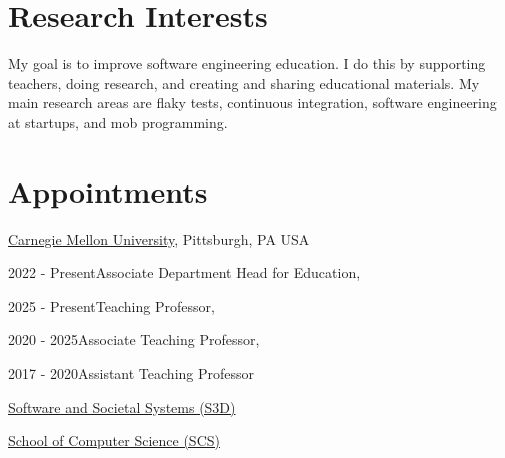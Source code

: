 \documentclass[10pt]{article}
\begin{document}

% 
\thispagestyle{empty}
\section{Research Interests}
My goal is to improve software engineering education.  I do this by supporting teachers, doing research, and creating and sharing educational materials. My main research areas are flaky tests, continuous integration, software engineering at startups, and mob programming.
 
%



\section{Appointments}

 \href{https://www.cmu.edu/}{Carnegie Mellon University},
Pittsburgh, PA USA

2022 - Present\qquad Associate Department Head for Education,

2025 - Present\qquad Teaching Professor, 

2020 - 2025\qquad Associate Teaching Professor, 


2017 - 2020\qquad Assistant Teaching Professor

\href{https://s3d.cmu.edu/}{Software and Societal Systems (S3D)}

\href{https://www.cs.cmu.edu/}{School of Computer Science (SCS)}    
\end{document}
